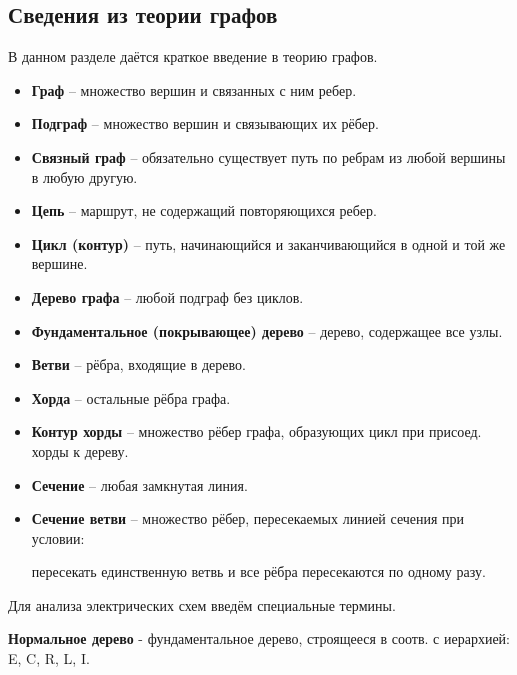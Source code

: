 	\subsection{Сведения из теории графов}
	\vspace{-0.5em}
	В данном разделе даётся краткое введение в теорию графов.
	\begin{itemize}
		\item \textbf{Граф} -- множество вершин и связанных с ним ребер.
		\vspace{-0.5em}
		\item \textbf{Подграф} -- множество вершин и связывающих их рёбер.
		\vspace{-0.5em}
		\item \textbf{Связный граф} -- обязательно существует путь по ребрам из любой вершины в любую другую.
		\vspace{-0.5em}
		\item \textbf{Цепь} -- маршрут, не содержащий повторяющихся ребер.
		\vspace{-0.5em}
		\item \textbf{Цикл (контур)} -- путь, начинающийся и заканчивающийся в одной и той же вершине.
		\vspace{-0.5em}
		\item \textbf{Дерево графа} -- любой подграф без циклов.
		\vspace{-0.5em}
		\item \textbf{Фундаментальное (покрывающее) дерево} -- дерево, содержащее все узлы.
		\vspace{-0.5em}
		\item \textbf{Ветви} -- рёбра, входящие в дерево.
		\vspace{-0.5em}
		\item \textbf{Хорда} -- остальные рёбра графа.
		\vspace{-0.5em}
		\item \textbf{Контур хорды} -- множество рёбер графа, образующих цикл при присоед. хорды к дереву.
		\vspace{-0.5em}
		\item \textbf{Сечение} -- любая замкнутая линия.
		\vspace{-0.5em}
		\item \textbf{Сечение ветви} -- множество рёбер, пересекаемых линией сечения при условии: 
		\par
		пересекать единственную ветвь и все рёбра пересекаются по одному разу.
	\end{itemize}
	\vspace{-0.5em}
	Для анализа электрических схем введём специальные термины.
	\par
	\textbf{Нормальное дерево} - фундаментальное дерево, строящееся в соотв. с иерархией: E, C, R, L, I.
	
